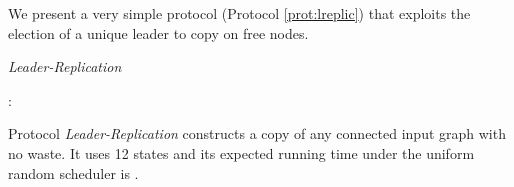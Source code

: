 \documentclass[oribibl, 11pt]{llncs}
\begin{document}
We present a very simple protocol (Protocol \ref{prot:lreplic}) that exploits the election of a unique leader to copy  on  free nodes.

\renewcommand{\algorithmiccomment}[1]{// #1}
\begin{algorithm}[!h]
  \caption{\emph{Leader-Replication}}\label{prot:lreplic}
  \begin{algorithmic}
    \medskip
    \State 
    \State : 
    
  \end{algorithmic}
\end{algorithm}

\begin{theorem}
Protocol \emph{Leader-Replication} constructs a copy of any connected input graph  with no waste. It uses 12 states and its expected running time under the uniform random scheduler is .
\end{theorem}
\end{document}
